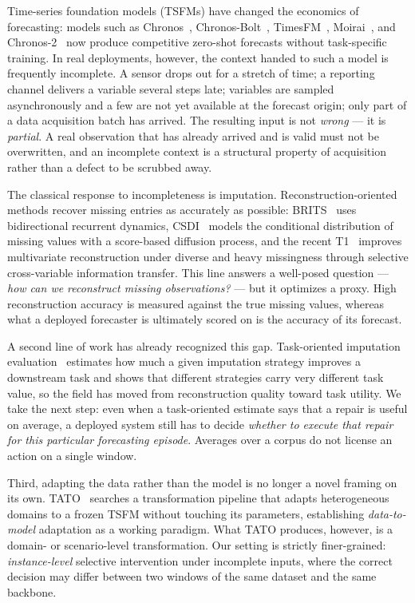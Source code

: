 \documentclass{article}
\newcommand{\tsfm}{TSFM}
\begin{document}
Time-series foundation models (\tsfm{}s) have changed the economics of forecasting:
models such as Chronos~\citep{ansari2024chronos}, Chronos-Bolt~\citep{chronosbolt2025},
TimesFM~\citep{das2024timesfm}, Moirai~\citep{woo2024moirai}, and
Chronos-2~\citep{chronos2_2025} now produce competitive zero-shot forecasts without
task-specific training. In real deployments, however, the context handed to such a
model is frequently incomplete. A sensor drops out for a stretch of time; a reporting
channel delivers a variable several steps late; variables are sampled asynchronously
and a few are not yet available at the forecast origin; only part of a data acquisition
batch has arrived. The resulting input is not \emph{wrong} --- it is \emph{partial}. A real
observation that has already arrived and is valid must not be overwritten, and an
incomplete context is a structural property of acquisition rather than a defect to be
scrubbed away.

The classical response to incompleteness is imputation. Reconstruction-oriented methods
recover missing entries as accurately as possible: BRITS~\citep{cao2018brits} uses
bidirectional recurrent dynamics, CSDI~\citep{tashiro2021csdi} models the conditional
distribution of missing values with a score-based diffusion process, and the recent
T1~\citep{park2026t1} improves multivariate reconstruction under diverse and heavy
missingness through selective cross-variable information transfer. This line answers a
well-posed question --- \emph{how can we reconstruct missing observations?} --- but it
optimizes a proxy. High reconstruction accuracy is measured against the true missing
values, whereas what a deployed forecaster is ultimately scored on is the accuracy of
its forecast.

A second line of work has already recognized this gap. Task-oriented imputation
evaluation~\citep{wang2024taskoriented} estimates how much a given imputation strategy
improves a downstream task and shows that different strategies carry very different task
value, so the field has moved from reconstruction quality toward task utility. We take the
next step: even when a task-oriented estimate says that a repair is useful on average, a
deployed system still has to decide \emph{whether to execute that repair for this
particular forecasting episode}. Averages over a corpus do not license an action on a
single window.

Third, adapting the data rather than the model is no longer a novel framing on its own.
TATO~\citep{qiu2026tato} searches a transformation pipeline that adapts heterogeneous
domains to a frozen \tsfm{} without touching its parameters, establishing
\emph{data-to-model} adaptation as a working paradigm. What TATO produces, however, is a
domain- or scenario-level transformation. Our setting is strictly finer-grained:
\emph{instance-level} selective intervention under incomplete inputs, where the correct
decision may differ between two windows of the same dataset and the same backbone.
\end{document}
